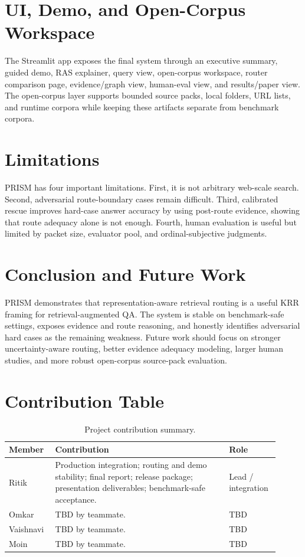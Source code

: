 \documentclass{article}
\begin{document}
\section{UI, Demo, and Open-Corpus Workspace}

The Streamlit app exposes the final system through an executive summary, guided demo, RAS explainer, query view, open-corpus workspace, router comparison page, evidence/graph view, human-eval view, and results/paper view. The open-corpus layer supports bounded source packs, local folders, URL lists, and runtime corpora while keeping these artifacts separate from benchmark corpora.

\section{Limitations}

PRISM has four important limitations. First, it is not arbitrary web-scale search. Second, adversarial route-boundary cases remain difficult. Third, calibrated rescue improves hard-case answer accuracy by using post-route evidence, showing that route adequacy alone is not enough. Fourth, human evaluation is useful but limited by packet size, evaluator pool, and ordinal-subjective judgments.

\section{Conclusion and Future Work}

PRISM demonstrates that representation-aware retrieval routing is a useful KRR framing for retrieval-augmented QA. The system is stable on benchmark-safe settings, exposes evidence and route reasoning, and honestly identifies adversarial hard cases as the remaining weakness. Future work should focus on stronger uncertainty-aware routing, better evidence adequacy modeling, larger human studies, and more robust open-corpus source-pack evaluation.

\section*{Contribution Table}

\begin{table}[h]
    \centering
    \small
    \begin{tabular}{p{0.16\linewidth} p{0.60\linewidth} p{0.15\linewidth}}
        \toprule
        \textbf{Member} & \textbf{Contribution} & \textbf{Role} \\
        \midrule
        Ritik & Production integration; routing and demo stability; final report; release package; presentation deliverables; benchmark-safe acceptance. & Lead / integration \\
        Omkar & TBD by teammate. & TBD \\
        Vaishnavi & TBD by teammate. & TBD \\
        Moin & TBD by teammate. & TBD \\
        \bottomrule
    \end{tabular}
    \caption{Project contribution summary.}
\end{table}



\end{document}
